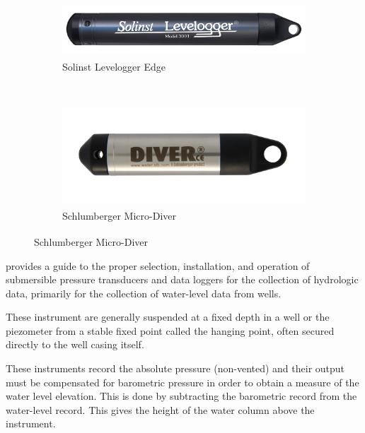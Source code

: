 \documentclass[12pt, letterpaper, fleqn]{report}
\begin{document}
\begin{figure}[h!]
        \centering
        \begin{subfigure}[t]{0.5\textwidth}
                \includegraphics[width=\textwidth]{img/Solinst_EdgeLeveLogger}
                \caption{Solinst Levelogger Edge\textsuperscript{\textregistered}}
                \label{subfig:levelogger_solinst}                
        \end{subfigure}%
        \\[0.5cm]
        \begin{subfigure}[t]{0.5\textwidth}
                \includegraphics[width=\textwidth]{img/Schlumberger_MiniDiver}
                \caption{Schlumberger Micro-Diver\textsuperscript{\textregistered}}
                \label{subfig:levelogger_schlumberger}
        \end{subfigure}
       
\end{figure}

\cite{freeman_use_2004} provides a guide to the proper selection, installation, and operation of submersible pressure transducers and data loggers for the collection of hydrologic data, primarily for the collection of water-level data from wells.

These instrument are generally suspended at a fixed depth in a well or the piezometer from a stable fixed point called the hanging point, often secured directly to the well casing itself.

These instruments record the absolute pressure (non-vented) and their output must be compensated for barometric pressure in order to obtain a measure of the water level elevation. This is done by subtracting the barometric record from the water-level record. This gives the height of the water column above the instrument.  
\end{document}
